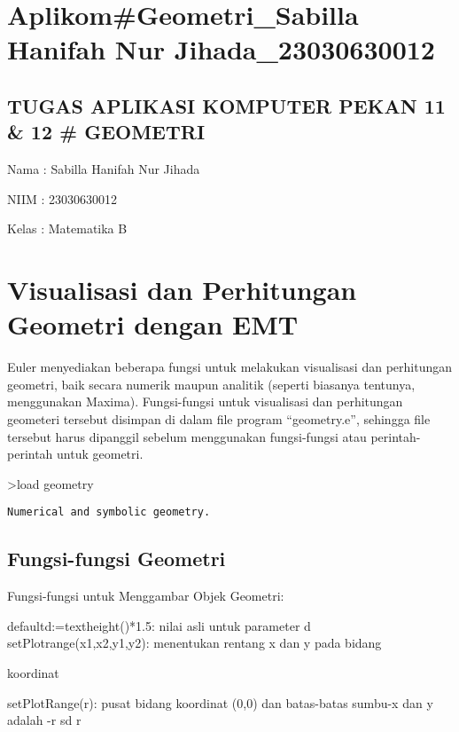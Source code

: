 \documentclass[
]{book}
\author{}
\date{}
\begin{document}
\frontmatter

\mainmatter
\chapter{Aplikom\#Geometri\_Sabilla Hanifah Nur Jihada\_23030630012}\label{aplikomgeometri_sabilla-hanifah-nur-jihada_23030630012}

\section{TUGAS APLIKASI KOMPUTER PEKAN 11 \& 12 \# GEOMETRI}\label{tugas-aplikasi-komputer-pekan-11-12-geometri}

Nama : Sabilla Hanifah Nur Jihada

NIIM : 23030630012

Kelas : Matematika B

\chapter{Visualisasi dan Perhitungan Geometri dengan EMT}\label{visualisasi-dan-perhitungan-geometri-dengan-emt}

Euler menyediakan beberapa fungsi untuk melakukan visualisasi dan perhitungan geometri, baik secara numerik maupun analitik (seperti biasanya tentunya, menggunakan Maxima). Fungsi-fungsi untuk visualisasi dan perhitungan geometeri tersebut disimpan di dalam file program ``geometry.e'', sehingga file tersebut harus dipanggil sebelum menggunakan fungsi-fungsi atau perintah-perintah untuk geometri.

\textgreater load geometry

\begin{verbatim}
Numerical and symbolic geometry.
\end{verbatim}

\section{Fungsi-fungsi Geometri}\label{fungsi-fungsi-geometri}

Fungsi-fungsi untuk Menggambar Objek Geometri:

defaultd:=textheight()*1.5: nilai asli untuk parameter d\\
setPlotrange(x1,x2,y1,y2): menentukan rentang x dan y pada bidang

koordinat

setPlotRange(r): pusat bidang koordinat (0,0) dan batas-batas sumbu-x dan y adalah -r sd r
\end{document}
